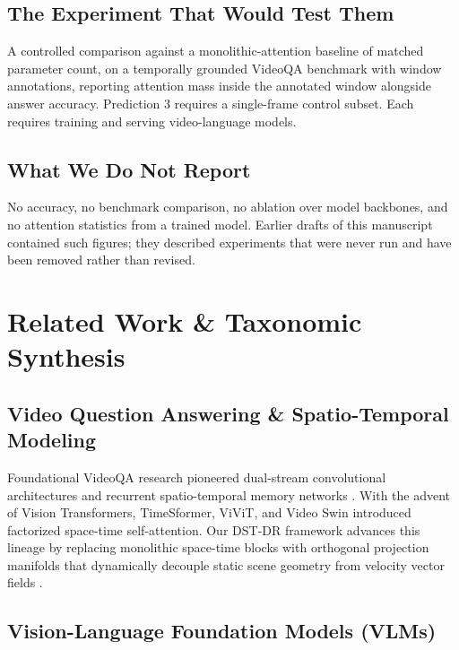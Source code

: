 \documentclass{article}
\begin{document}
\subsection{The Experiment That Would Test Them}


A controlled comparison against a monolithic-attention baseline of matched parameter count, on a temporally grounded VideoQA benchmark with window annotations, reporting attention mass inside the annotated window alongside answer accuracy. Prediction 3 requires a single-frame control subset. Each requires training and serving video-language models.


\subsection{What We Do Not Report}


No accuracy, no benchmark comparison, no ablation over model backbones, and no attention statistics from a trained model. Earlier drafts of this manuscript contained such figures; they described experiments that were never run and have been removed rather than revised.




\section{Related Work \& Taxonomic Synthesis}



\subsection{Video Question Answering \& Spatio-Temporal Modeling}

Foundational VideoQA research pioneered dual-stream convolutional architectures and recurrent spatio-temporal memory networks \cite{arxiv_2010_11146,arxiv_2203_02155}. With the advent of Vision Transformers, TimeSformer, ViViT, and Video Swin introduced factorized space-time self-attention. Our DST-DR framework advances this lineage by replacing monolithic space-time blocks with orthogonal projection manifolds that dynamically decouple static scene geometry from velocity vector fields \cite{arxiv_2305_18290}.


\subsection{Vision-Language Foundation Models (VLMs)}
\end{document}
